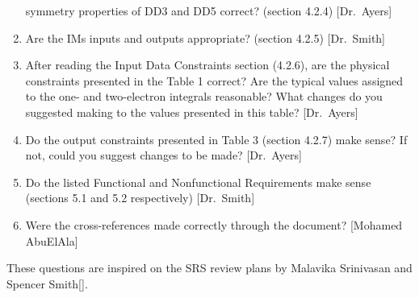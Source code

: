 \documentclass[12pt, titlepage]{article}
\begin{document}
\begin{enumerate}
	symmetry properties of DD3 and DD5 correct? (section 4.2.4) [Dr.\ Ayers]
	\item Are the IMs inputs and outputs appropriate? (section 4.2.5) [Dr.\ 
	Smith]
	\item After reading the Input Data Constraints section (4.2.6), are the 
	physical constraints presented in the Table 1 correct? Are the typical 
	values assigned to the one- and two-electron integrals reasonable? What 
	changes do you suggested making to the values presented in this table? 
	[Dr.\ Ayers]
	\item Do the output constraints presented in Table 3 (section 4.2.7) make 
	sense? If not, could you suggest changes to be made? [Dr.\ Ayers]
	\item Do the listed Functional and Nonfunctional Requirements make sense 
	(sections 5.1 and 5.2 respectively) [Dr.\ Smith]
	\item Were the cross-references made correctly through the document? 
	[Mohamed AbuElAla]
	
\end{enumerate}
These questions are inspired on the SRS review plans by Malavika Srinivasan and 
Spencer Smith[\cite{malavika}]. 
\end{document}
